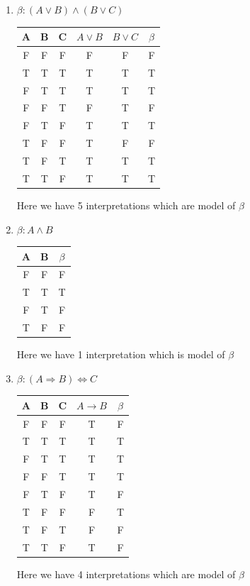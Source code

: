 \documentclass[a4paper,10pt]{article}
\begin{document}
\begin {enumerate}
 \item $\beta : (A \vee B) \wedge(B \vee C)$
 \begin{center}

 \begin{tabular}{|c|c|c|c|c||c|}
	\hline
	A & B & C & $A \vee B$ & $B \vee C$& $\beta$ \\
	\hline 
	F & F & F & F & F & F \\
	\hline
	T & T & T & T & T & T \\
	\hline
	F & T & T & T & T & T \\
	\hline
	F & F & T & F & T & F \\
	\hline
	F & T & F & T & T & T \\
	\hline
	T & F & F & T & F & F \\
	\hline
	T & F & T & T & T & T \\
	\hline
	T & T & F & T & T & T \\
 	\hline
 \end{tabular}
 
 \end{center}
 Here we have 5 interpretations which are model of $\beta$
 \item $\beta : A \wedge B$\\
 
 \begin{center}

 \begin{tabular}{|c|c||c|}
	\hline
	A & B & $\beta$ \\
	\hline 
	F & F & F  \\
	\hline
	T & T & T  \\
	\hline
	F & T & F \\
	\hline
	T & F & F \\
	\hline
 \end{tabular}
  
 \end{center}
 
 Here we have 1 interpretation which is model of $\beta$
\item $\beta : (A \Rightarrow B) \Leftrightarrow C $


 \begin{center}

 \begin{tabular}{|c|c|c|c||c|}
	\hline
	A & B & C & $A \rightarrow B$ & $\beta$ \\
	\hline 
	F & F & F & T & F \\
	\hline
	T & T & T & T & T \\
	\hline
	F & T & T & T & T \\
	\hline
	F & F & T & T & T  \\
	\hline
	F & T & F & T & F \\
	\hline
	T & F & F & F & T \\
	\hline
	T & F & T & F & F \\
	\hline
	T & T & F & T & F \\
 	\hline
 \end{tabular}
  
 \end{center}
 Here we have 4 interpretations which are model of $\beta$
\end {enumerate}
\end{document}
